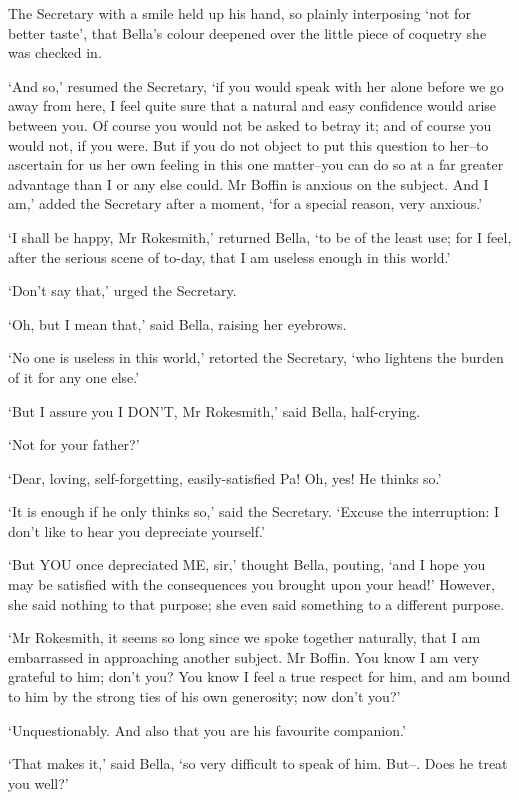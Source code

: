 The Secretary with a smile held up his hand, so plainly interposing ‘not
for better taste’, that Bella’s colour deepened over the little piece of
coquetry she was checked in.

‘And so,’ resumed the Secretary, ‘if you would speak with her alone
before we go away from here, I feel quite sure that a natural and easy
confidence would arise between you. Of course you would not be asked to
betray it; and of course you would not, if you were. But if you do not
object to put this question to her--to ascertain for us her own feeling
in this one matter--you can do so at a far greater advantage than I or
any else could. Mr Boffin is anxious on the subject. And I am,’ added
the Secretary after a moment, ‘for a special reason, very anxious.’

‘I shall be happy, Mr Rokesmith,’ returned Bella, ‘to be of the least
use; for I feel, after the serious scene of to-day, that I am useless
enough in this world.’

‘Don’t say that,’ urged the Secretary.

‘Oh, but I mean that,’ said Bella, raising her eyebrows.

‘No one is useless in this world,’ retorted the Secretary, ‘who lightens
the burden of it for any one else.’

‘But I assure you I DON’T, Mr Rokesmith,’ said Bella, half-crying.

‘Not for your father?’

‘Dear, loving, self-forgetting, easily-satisfied Pa! Oh, yes! He thinks
so.’

‘It is enough if he only thinks so,’ said the Secretary. ‘Excuse the
interruption: I don’t like to hear you depreciate yourself.’

‘But YOU once depreciated ME, sir,’ thought Bella, pouting, ‘and I hope
you may be satisfied with the consequences you brought upon your head!’
However, she said nothing to that purpose; she even said something to a
different purpose.

‘Mr Rokesmith, it seems so long since we spoke together naturally, that
I am embarrassed in approaching another subject. Mr Boffin. You know I
am very grateful to him; don’t you? You know I feel a true respect for
him, and am bound to him by the strong ties of his own generosity; now
don’t you?’

‘Unquestionably. And also that you are his favourite companion.’

‘That makes it,’ said Bella, ‘so very difficult to speak of him. But--.
Does he treat you well?’

